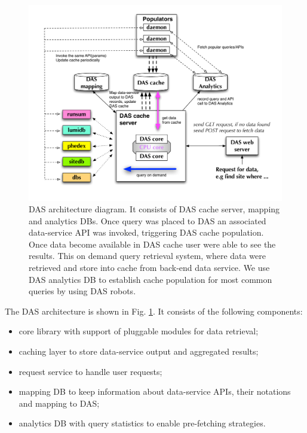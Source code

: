 \documentclass[a4paper]{jpconf}
\begin{document}
\begin{figure}[htb]
\centering
\includegraphics[width=150mm]{DAS_Cache_and_Analytics.pdf}
\caption{
DAS architecture diagram. It consists of DAS cache server, mapping and analytics DBs.
Once query was placed to DAS an associated
data-service API was invoked, triggering DAS cache population. Once data become
available in DAS cache user were able to see the results. This on demand
query retrieval system, where data were retrieved and store into cache from
back-end data service. We use DAS analytics DB to establish cache population
for most common queries by using DAS robots.
}
\label{DAS_cache}
\end{figure}

\noindent
The DAS architecture is shown in Fig. \ref{DAS_cache}. It consists of the
following components:
\begin{itemize}
\item core library with support of pluggable modules for data retrieval;
\item caching layer to store data-service output and aggregated results;
\item request service to handle user requests;
\item mapping DB to keep information about data-service APIs, their
notations and mapping to DAS;
\item analytics DB with query statistics to enable pre-fetching 
strategies.
\end{itemize}
\end{document}
